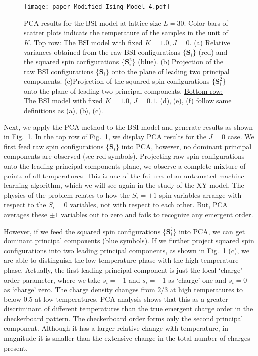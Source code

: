 \documentclass[pra,letterpaper,10pt,twocolumn]{revtex4}
\begin{document}
\begin{figure}[!h]
\texttt{[image: paper\_Modified\_Ising\_Model\_4.pdf]}  
\caption{
PCA results for the BSI model at lattice size $L=30$. Color bars of
scatter plots indicate the temperature of the samples in the unit of
$K$. \underline{Top row:} The BSI model with fixed $K=1.0$, $J=0$.  (a) Relative variances obtained from the raw BSI configurations
$\{\mathbf{S}_i\}$ (red) and the squared spin configurations
$\{\mathbf{S}^2_i\}$ (blue). (b) Projection of the raw BSI
configurations $\{\mathbf{S}_i\}$ onto the plane of leading two
principal components. (c)Projection of the squared spin configurations
$\{\mathbf{S}^2_i\}$ onto the plane of leading two principal components. 
\underline{Bottom row:} The BSI model with fixed $K=1.0$, $J=0.1$.  (d),
(e), (f) follow same definitions as (a), (b), (c).
\label{fig:Modified_Ising_Model_4}
}
\end{figure}

Next, we apply the PCA method to the BSI model and generate results as
shown in Fig.~\ref{fig:Modified_Ising_Model_4}. In the top row of
Fig.~\ref{fig:Modified_Ising_Model_4}, we display PCA results for the
$J=0$ case. We first feed raw spin configurations $\{\mathbf{S}_i\}$
into PCA, however, no dominant principal components are observed (see
red symbols).  Projecting raw spin configurations onto the leading
principal components plane, we observe a complete mixture of points of
all temperatures.  This is one of the failures of an automated machine
learning algorithm, which we will see again in the study of the XY
model. The physics of the problem relates to how the $S_i=\pm 1$ spin
variables arrange with respect to the $S_i=0$ variables, not with
respect to each other. But, PCA averages these $\pm 1$ variables out to
zero and fails to recognize any emergent order.

However, if we feed the squared spin configurations $\{\mathbf{S}^2_i\}$
into PCA, we can get dominant principal components (blue symbols).  If
we further project squared spin configurations into two leading
principal components, as shown in Fig.~\ref{fig:Modified_Ising_Model_4}
(c), we are able to distinguish the low temperature phase with the high
temperature phase. Actually, the first leading principal component is
just the local `charge' order parameter, where we take $s_i=+1$ and
$s_i=-1$ as `charge' one and $s_i=0$ as `charge' zero. The charge
density changes from $2/3$ at high temperatures to below $0.5$ at low
temperatures. PCA analysis shows that this as a greater discriminant of
different temperatures than the true emergent charge order in the
checkerboard pattern. The checkerboard order forms only the second
principal component. Although it has a larger relative change with
temperature, in magnitude it is smaller than the extensive change in the
total number of charges present.
\end{document}
